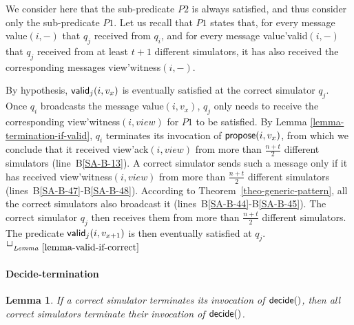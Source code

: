 \documentclass[11pt,letterpaper]{article}
\newtheorem{lemma}{Lemma}
\newlength {\afterproof}
\newcommand{\toto}{xxx}
\newenvironment{proofL}{\noindent{\bf Proof }}
{\hspace*{\fill}$\Box_{\mathit{Lemma}~\ref{\toto}}$\par\vspace{\afterproof}}
\begin{document}
\begin{proofL}
We  consider here that the sub-predicate $P2$ is always satisfied, and
thus consider only the sub-predicate $P1$. Let us recall that $P1$ states
that, for every message {\sc value}$(i,-)$ that $q_j$ received from $q_i$,
and for every message {\sc value'valid}$(i,-)$ that $q_j$ received from 
at least $t+1$ different simulators, it has also
received the corresponding messages {\sc view'witness}$(i,-)$.

By hypothesis, ${\sf valid}_j(i,v_x)$ is eventually satisfied at the
correct simulator $q_j$. Once $q_i$ broadcasts the message
{\sc value}$(i,v_x)$, $q_j$  only needs  to receive the corresponding
{\sc view'witness}$(i,view)$ for $P1$ to be satisfied.
By Lemma \ref{lemma-termination-if-valid}, $q_i$ terminates its invocation
of ${\sf propose}(i,v_x)$, from which we conclude that it  received
{\sc view'ack}$(i,view)$ from more than  $\frac{n+t}{2}$ different simulators
(line~B\ref{SA-B-13}).
A correct simulator sends such a message only if it has received
{\sc view'witness}$(i,view)$ from more than  $\frac{n+t}{2}$ different
simulators (lines~B\ref{SA-B-47}-B\ref{SA-B-48}).
According to Theorem~\ref{theo-generic-pattern},
all the correct simulators  also broadcast it
(lines~B\ref{SA-B-44}-B\ref{SA-B-45}). The correct simulator $q_j$  then
receives them from more than $\frac{n+t}{2}$ different simulators.
The predicate ${\sf valid}_j(i,v_{x+1})$ is then eventually satisfied at 
$q_j$.
\renewcommand{\toto}{lemma-valid-if-correct}
\end{proofL}

\paragraph{Decide-termination}

\begin{lemma}
\label{lemma:one-decides-all-decide}
If a correct simulator terminates its invocation of ${\sf decide}()$, 
then all correct simulators terminate their invocation of ${\sf decide}()$.
\end{lemma}
\end{document}
